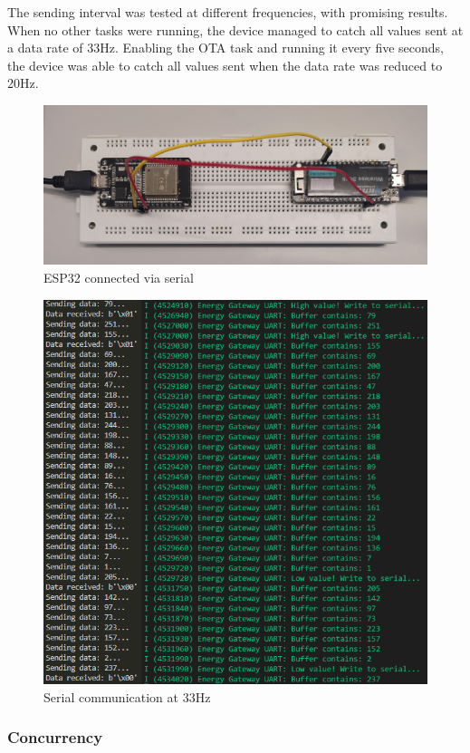 The sending interval was tested at different frequencies, with promising results. When no other tasks were running, the device managed to catch all values sent at a data rate of 33Hz. Enabling the OTA task and running it every five seconds, the device was able to catch all values sent when the data rate was reduced to 20Hz.

\begin{figure}[ht]
  \centering
  \includegraphics[width=0.8\linewidth]{figures/serial_connection.jpg}
  \caption{ESP32 connected via serial}
  \label{fig:serial_connection}
\end{figure}

\begin{figure}[ht]
  \centering
  \includegraphics[width=0.8\linewidth]{figures/send_receive_33Hz.png}
  \caption{Serial communication at 33Hz}
  \label{fig:serial_communication_33hz}
\end{figure}

\subsubsection{Concurrency}

